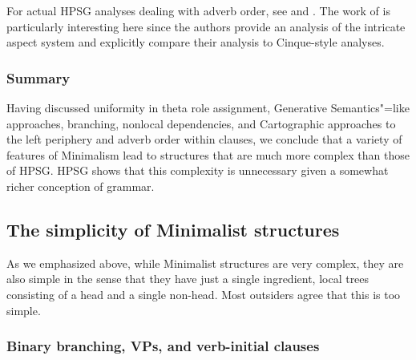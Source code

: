 \documentclass[output=paper,biblatex,babelshorthands,newtxmath,draftmode,colorlinks,citecolor=brown]{langscibook}
\begin{document}
For actual HPSG analyses dealing with adverb order, see  and .
The work of \citet{KM2005a} is particularly interesting here since the authors provide an analysis of the
intricate  aspect system and explicitly compare their analysis to Cinque-style analyses.


\subsubsection{Summary}

Having discussed uniformity in theta role assignment, Generative Semantics"=like approaches,
branching, nonlocal dependencies, and Cartographic approaches to the left periphery and adverb 
order within clauses,  we conclude that a variety of features of Minimalism lead to structures that
are much more complex than those of HPSG. HPSG shows that this complexity is unnecessary given a
somewhat richer conception of grammar. 

\subsection{The simplicity of Minimalist structures}
\label{subsec:min-simplicity}

As we emphasized above, while Minimalist structures are very complex, they are also simple in the
sense that they have just a single ingredient, local trees consisting of a head and a single
non-head. Most outsiders agree that this is too simple.

\subsubsection{Binary branching, VPs, and verb-initial clauses}
\end{document}
